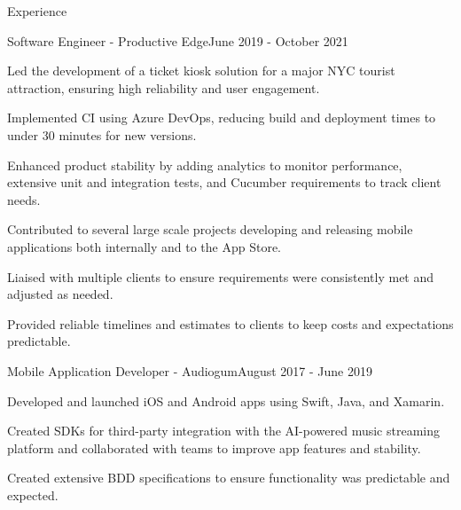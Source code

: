 \documentclass[
	10pt, %
]{resume} %
\begin{document}
\begin{rSection}{Experience}

	\begin{rSubsection}{Software Engineer - Productive Edge}{June 2019 - October 2021}{}{}
		\item Led the development of a ticket kiosk solution for a major NYC tourist attraction, ensuring high reliability and user engagement.
		\item Implemented CI using Azure DevOps, reducing build and deployment times to under 30 minutes for new versions.
		\item Enhanced product stability by adding analytics to monitor performance, extensive unit and integration tests, and Cucumber requirements to track client needs.
		\item Contributed to several large scale projects developing and releasing mobile applications both internally and to the App Store.
		\item Liaised with multiple clients to ensure requirements were consistently met and adjusted as needed. 
		\item Provided reliable timelines and estimates to clients to keep costs and expectations predictable.
	\end{rSubsection}


	\begin{rSubsection}{Mobile Application Developer - Audiogum}{August 2017 - June 2019}{}{}	
	\item Developed and launched iOS and Android apps using Swift, Java, and Xamarin.
	\item Created SDKs for third-party integration with the AI-powered music streaming platform and collaborated with teams to improve app features and stability.
	\item Created extensive BDD specifications to ensure functionality was predictable and expected.
\end{rSubsection}
		
	
	\end{rSection}

	
\end{document}
